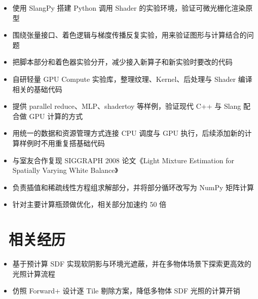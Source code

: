 \documentclass{resume}
\begin{document}
\begin{onehalfspacing}
\begin{itemize}
  \item 使用 SlangPy 搭建 Python 调用 Shader 的实验环境，验证可微光栅化渲染原型
  \item 围绕张量接口、着色逻辑与梯度传播反复实验，用来验证图形与计算结合的问题
  \item 把脚本部分和着色器实验分开，减少接入新算子和新实验时要改的代码
\end{itemize}
\end{onehalfspacing}

\begin{onehalfspacing}
\begin{itemize}
  \item 自研轻量 GPU Compute 实验库，整理纹理、Kernel、后处理与 Shader 编译相关的基础代码
  \item 提供 parallel reduce、MLP、shadertoy 等样例，验证现代 C++ 与 Slang 配合做 GPU 计算的方式
  \item 用统一的数据和资源管理方式连接 CPU 调度与 GPU 执行，后续添加新的计算样例时不用重复搭基础代码
\end{itemize}
\end{onehalfspacing}

\begin{onehalfspacing}
\begin{itemize}
  \item 与室友合作复现 SIGGRAPH 2008 论文《Light Mixture Estimation for Spatially Varying White Balance》
  \item 负责插值和稀疏线性方程组求解部分，并将部分循环改写为 NumPy 矩阵计算
  \item 针对主要计算瓶颈做优化，相关部分加速约 50 倍
\end{itemize}
\end{onehalfspacing}

\section{\faUsers\ 相关经历}

\begin{onehalfspacing}
\begin{itemize}
  \item 基于预计算 SDF 实现软阴影与环境光遮蔽，并在多物体场景下探索更高效的光照计算流程
  \item 仿照 Forward+ 设计逐 Tile 剔除方案，降低多物体 SDF 光照的计算开销
\end{itemize}
\end{onehalfspacing}
\end{document}
